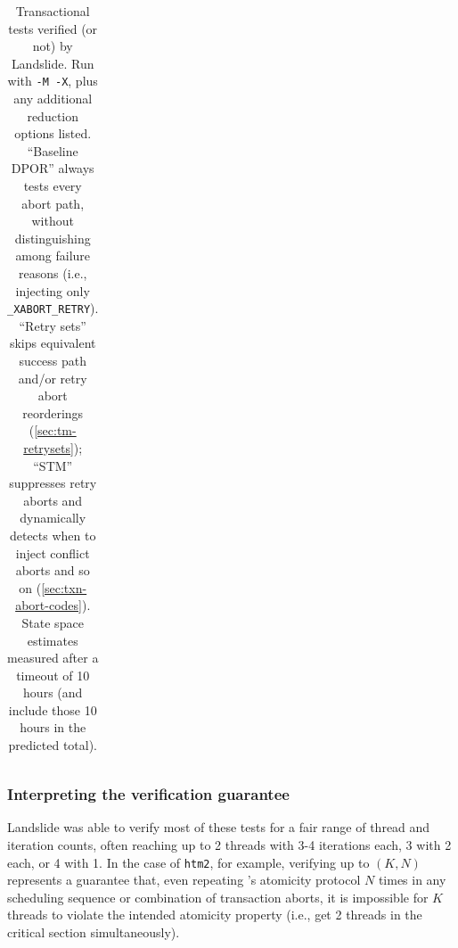 \begin{table}[p]
\begin{center}
\begin{tabular}{cc||r|r||r|r||r|r}
		\end{tabular}
	\end{center}
	\caption[Transactional tests verified (or not) by Landslide.]
		{Transactional tests verified (or not) by Landslide.
		Run with {\tt -M -X}, plus any additional reduction options listed.
		``Baseline DPOR'' always tests every abort path, without distinguishing among failure reasons
		(i.e., injecting only {\tt \_XABORT\_RETRY}).
		``Retry sets'' skips equivalent success path and/or retry abort reorderings (\cref{sec:tm-retrysets});
		``STM'' suppresses retry aborts and dynamically detects when to inject conflict aborts and so on
		(\cref{sec:txn-abort-codes}).
		State space estimates measured after a timeout of 10 hours (and include those 10 hours in the predicted total).
		}
	\label{tab:tm-verifs}
\end{table}

\subsubsection{Interpreting the verification guarantee}

Landslide was able to verify most of these tests for a fair range of thread and iteration counts,
often reaching up to 2 threads with 3-4 iterations each, 3 with 2 each, or 4 with 1.
In the case of {\tt htm2}, for example,
verifying up to $(K, N)$ represents a guarantee that,
even repeating 's atomicity protocol $N$ times
in any scheduling sequence or combination of transaction aborts,
it is impossible for $K$ threads to violate the intended atomicity property
(i.e., get 2 threads in the critical section simultaneously).

